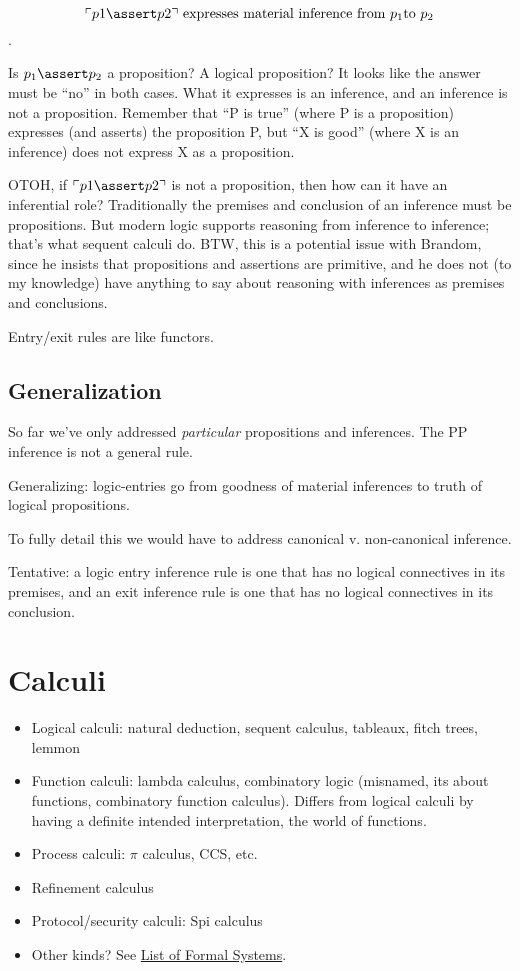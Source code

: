 \documentclass{article}
\begin{document}
\[\ulcorner p1\linfer p2\urcorner\ \text{expresses
material inference from}\ p_1 \text{to}\ p_2\].

Is \(p_1\linfer p_2\) a proposition? A logical proposition? It looks like
the answer must be ``no'' in both cases. What it expresses is an
inference, and an inference is not a proposition. Remember that ``P is
true'' (where P is a proposition) expresses (and asserts) the
proposition P, but ``X is good'' (where X is an inference) does not
express X as a proposition.

OTOH, if \(\ulcorner p1\linfer p2\urcorner\) is not a proposition, then
how can it have an inferential role? Traditionally the premises and
conclusion of an inference must be propositions. But modern logic
supports reasoning from inference to inference; that's what sequent
calculi do. BTW, this is a potential issue with Brandom, since he
insists that propositions and assertions are primitive, and he does
not (to my knowledge) have anything to say about reasoning with
inferences as premises and conclusions.

Entry/exit rules are like functors.

\subsection{Generalization}

So far we've only addressed \textit{particular} propositions and
inferences.  The PP inference is not a general rule.

Generalizing: logic-entries go from goodness of material inferences to
truth of logical propositions.

To fully detail this we would have to address canonical v.
non-canonical inference.

Tentative: a logic entry inference rule is one that has no logical
connectives in its premises, and an exit inference rule is one that
has no logical connectives in its conclusion.


\section{Calculi}

\begin{itemize}
\item Logical calculi: natural deduction, sequent calculus, tableaux, fitch trees, lemmon
\item Function calculi: lambda calculus, combinatory logic (misnamed, its
about functions, combinatory function calculus). Differs from logical
calculi by having a definite intended interpretation, the world of
functions.
\item Process calculi: \(\pi\) calculus, CCS, etc.
\item Refinement calculus
\item Protocol/security calculi: Spi calculus
\item Other kinds?  See \href{https://en.wikipedia.org/wiki/List_of_formal_systems}{List of Formal Systems}.
\end{itemize}
\end{document}
